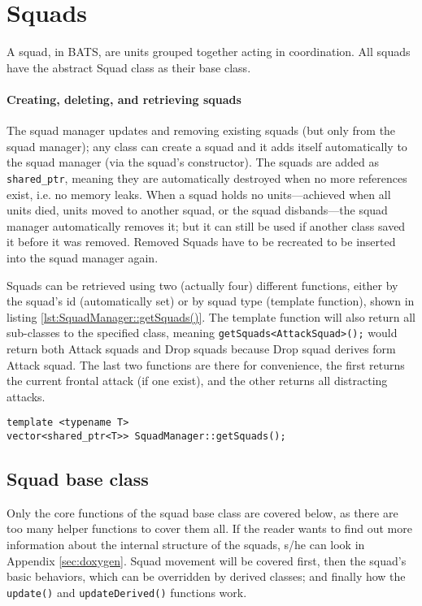 \section{Squads}
A squad, in BATS, are units grouped together acting in coordination. All squads have the abstract Squad class as their base class. 

\paragraph{Creating, deleting, and retrieving squads}
The squad manager updates and removing existing squads (but only from the squad manager); any class can create a squad and it adds itself automatically to the squad manager (via the squad's constructor). The squads are added as \texttt{shared\_ptr}, meaning they are automatically destroyed when no more references exist, i.e. no memory leaks. When a squad holds no units—achieved when all units died, units moved to another squad, or the squad disbands—the squad manager automatically removes it; but it can still be used if another class saved it before it was removed. Removed Squads have to be recreated to be inserted into the squad manager again.

Squads can be retrieved using two (actually four) different functions, either by the squad's id (automatically set) or by squad type (template function), shown in listing \ref{lst:SquadManager::getSquads()}. The template function will also return all sub-classes to the specified class, meaning \texttt{getSquads<AttackSquad>();} would return both Attack squads and Drop squads because Drop squad derives form Attack squad. The last two functions are there for convenience, the first returns the current frontal attack (if one exist), and the other returns all distracting attacks.
\begin{lstlisting}[caption={Template function to retrieve squads of the specified type},label={lst:SquadManager::getSquads()}]
template <typename T>
vector<shared_ptr<T>> SquadManager::getSquads();
\end{lstlisting}

\subsection{Squad base class}
Only the core functions of the squad base class are covered below, as there are too many helper functions to cover them all. If the reader wants to find out more information about the internal structure of the squads, s/he can look in Appendix \ref{sec:doxygen}. Squad movement will be covered first, then the squad's basic behaviors, which can be overridden by derived classes; and finally how the \texttt{update()} and \texttt{updateDerived()} functions work.

